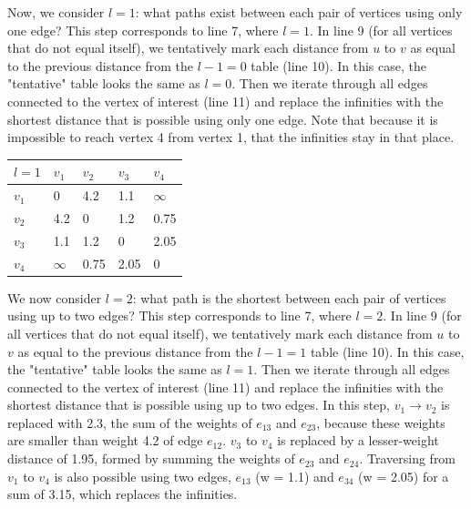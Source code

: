 \documentclass{article}
\begin{document}
Now, we consider $l = 1$: what paths exist between each pair of vertices using only one edge? This step corresponds to line 7, where $l = 1$. In line 9 (for all vertices that do not equal itself), we tentatively mark each distance from $u$ to $v$ as equal to the previous distance from the $l - 1 = 0$ table (line 10). In this case, the "tentative" table looks the same as $l = 0$. Then we iterate through all edges connected to the vertex of interest (line 11) and replace the infinities with the shortest distance that is possible using only one edge. Note that because it is impossible to reach vertex 4 from vertex 1, that the infinities stay in that place. 

\begin{table}[]
\begin{tabular}{|l|l|l|l|l|}
\hline
$l = 1$  & $v_1$                  & $v_2$                  & $v_3$                  & $v_4$                  \\ \hline
$v_1$ & 0                     & 4.2 & 1.1 & $\infty$ \\ \hline
$v_2$ & 4.2 & 0                     & 1.2 & 0.75 \\ \hline
$v_3$ & 1.1 & 1.2 & 0                     & 2.05 \\ \hline
$v_4$ & $\infty$ & 0.75 & 2.05 & 0                     \\ \hline
\end{tabular}
\end{table}

We now consider $l = 2$: what path is the shortest between each pair of vertices using up to two edges? This step corresponds to line 7, where $l = 2$. In line 9 (for all vertices that do not equal itself), we tentatively mark each distance from $u$ to $v$ as equal to the previous distance from the $l - 1 = 1$ table (line 10). In this case, the "tentative" table looks the same as $l = 1$. Then we iterate through all edges connected to the vertex of interest (line 11) and replace the infinities with the shortest distance that is possible using up to two edges. In this step, $v_1 \rightarrow v_2$ is replaced with 2.3, the sum of the weights of $e_{13}$ and $e_{23}$, because these weights are smaller than weight 4.2 of edge $e_{12}$. $v_3$ to $v_4$ is replaced by a lesser-weight distance of 1.95, formed by summing the weights of $e_{23}$ and $e_{24}$. Traversing from $v_1$ to $v_4$ is also possible using two edges, $e_{13}$ (w = 1.1) and $e_{34}$ (w = 2.05) for a sum of 3.15, which replaces the infinities. 
\end{document}
